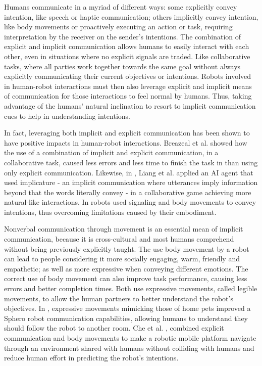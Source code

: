 \documentclass[letterpaper, 10 pt, conference]{ieeeconf}
\begin{document}
Humans communicate in a myriad of different ways: some explicitly convey intention, like speech or haptic communication; others implicitly convey intention, like body movements or proactively executing an action or task, requiring interpretation by the receiver on the sender's intentions. \cite{bauer2008ijhr} The combination of explicit and implicit communication allows humans to easily interact with each other, even in situations where no explicit signals are traded. Like collaborative tasks, where all parties work together towards the same goal without always explicitly communicating their current objectives or intentions. Robots involved in human-robot interactions must then also leverage explicit and implicit means of communication for those interactions to feel normal by humans. Thus, taking advantage of the humans' natural inclination to resort to implicit communication cues to help in understanding intentions. \cite{gildert2018frontiers} 

In fact, leveraging both implicit and explicit communication has been shown to have positive impacts in human-robot interactions. Breazeal et al.\cite{breazeal2005iros} showed how the use of a combination of implicit and explicit communication, in a collaborative task, caused less errors and less time to finish the task in than using only explicit communication. Likewise, in \cite{liang2019chi}, Liang et al. applied an AI agent that used implicature - an implicit communication where utterances imply information beyond that the words literally convey - in a collaborative game achieving more natural-like interactions. In \cite{faria2016roman, baraka2016expressive} robots used signaling and body movements to convey intentions, thus overcoming limitations caused by their embodiment.

Nonverbal communication through movement is an essential mean of implicit communication, because it is cross-cultural and most humans comprehend without being previously explicitly taught. \cite{ekman1969repertoire} The use body movement by a robot can lead to people considering it more socially engaging, warm, friendly and empathetic; as well as more expressive when conveying different emotions. The correct use of body movement can also improve task performance, causing less errors and better completion times. \cite{saunderson2019ijsr} Both \cite{dragan2015hri, faria2017iros} use expressive movements, called legible movements, to allow the human partners to better understand the robot's objectives. In \cite{faria2016roman}, expressive movements mimicking those of home pets improved a Sphero robot communication capabilities, allowing humans to understand they should follow the robot to another room. Che et al. \cite{che2020tr}, combined explicit communication and body movements to make a robotic mobile platform navigate through an environment shared with humans without colliding with humans and reduce human effort in predicting the robot's intentions.
\end{document}
